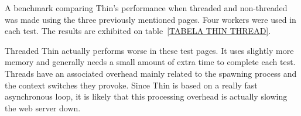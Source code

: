 A benchmark comparing Thin's performance when threaded and non-threaded was made using the three previously mentioned pages. Four workers were used in each test. The results are exhibited on table~\ref{TABELA THIN THREAD}.

Threaded Thin actually performs worse in these test pages. It uses slightly more memory and generally needs a small amount of extra time to complete each test. Threads have an associated overhead mainly related to the spawning process and the context switches they provoke. Since Thin is based on a really fast asynchronous loop, it is likely that this processing overhead is actually slowing the web server down.
